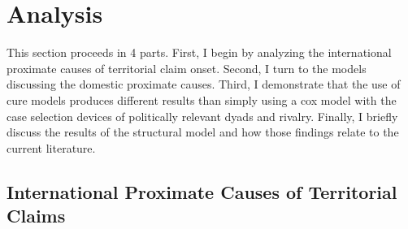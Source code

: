 



\section{Analysis}
This section proceeds in 4 parts. First, I begin by analyzing the international proximate causes of territorial claim onset. Second, I turn to the models discussing the domestic proximate causes. Third, I demonstrate that the use of cure models produces different results than simply using a cox model with the case selection devices of politically relevant dyads and rivalry. Finally, I briefly discuss the results of the structural model and how those findings relate to the current literature.

\begin{comment}
add titles
& \multicolumn{2}{c}{\underline{Model 1}} & \multicolumn{2}{c}{\underline{Model 2}} \\
& Structural & Proximate & Structural & Proximate \\ \hline
"\multicolumn{2}{c}{Model 1}", "&", "\multicolumn{2}{c}{Model 2}", " &")
Replace incidence
Replace zeroes
htpb
\end{comment}

\subsection{International Proximate Causes of Territorial Claims}

